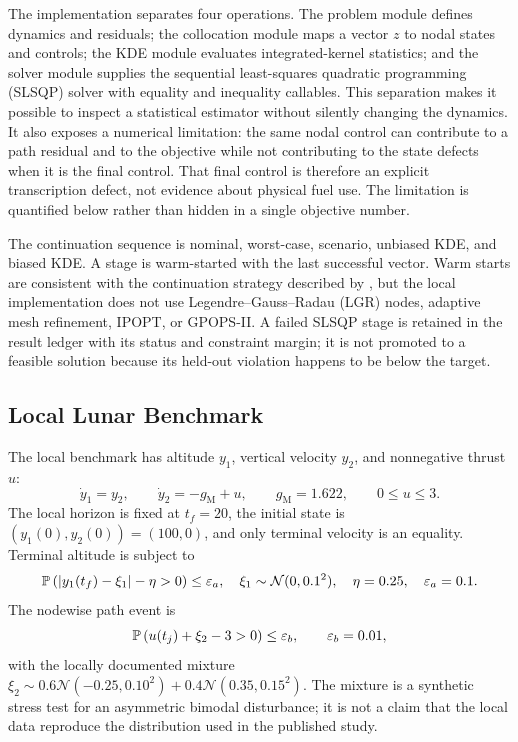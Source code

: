 The implementation separates four operations. The problem module defines dynamics and residuals; the collocation module maps a vector $z$ to nodal states and controls; the KDE module evaluates integrated-kernel statistics; and the solver module supplies the sequential least-squares quadratic programming (SLSQP) solver with equality and inequality callables. This separation makes it possible to inspect a statistical estimator without silently changing the dynamics. It also exposes a numerical limitation: the same nodal control can contribute to a path residual and to the objective while not contributing to the state defects when it is the final control. That final control is therefore an explicit transcription defect, not evidence about physical fuel use. The limitation is quantified below rather than hidden in a single objective number.

The continuation sequence is nominal, worst-case, scenario, unbiased KDE, and biased KDE. A stage is warm-started with the last successful vector. Warm starts are consistent with the continuation strategy described by \citet{keil2021warm}, but the local implementation does not use Legendre--Gauss--Radau (LGR) nodes, adaptive mesh refinement, IPOPT, or GPOPS-II. A failed SLSQP stage is retained in the result ledger with its status and constraint margin; it is not promoted to a feasible solution because its held-out violation happens to be below the target.

\subsection{Local Lunar Benchmark}
\label{sec:lunar-benchmark}

The local benchmark has altitude $y_1$, vertical velocity $y_2$, and nonnegative thrust $u$:
\begin{equation}
 \dot y_1=y_2,\qquad \dot y_2=-g_{\mathrm M}+u,\qquad g_{\mathrm M}=1.622,\qquad 0\leq u\leq3.
 \label{eq:lunar-dynamics}
\end{equation}
The local horizon is fixed at $t_f=20$, the initial state is $(y_1(0),y_2(0))=(100,0)$, and only terminal velocity is an equality. Terminal altitude is subject to
\begin{equation}
 \mathbb{P}\left(\left|y_1(t_f)-\xi_1\right|-\eta>0\right)\leq\varepsilon_a,
 \quad \xi_1\sim\mathcal N(0,0.1^2),\quad \eta=0.25,\quad \varepsilon_a=0.1.
 \label{eq:lunar-terminal-risk}
\end{equation}
The nodewise path event is
\begin{equation}
 \mathbb{P}\left(u(t_j)+\xi_2-3>0\right)\leq\varepsilon_b,
 \qquad \varepsilon_b=0.01,
 \label{eq:lunar-path-risk}
\end{equation}
with the locally documented mixture $\xi_2\sim0.6\mathcal N(-0.25,0.10^2)+0.4\mathcal N(0.35,0.15^2)$. The mixture is a synthetic stress test for an asymmetric bimodal disturbance; it is not a claim that the local data reproduce the distribution used in the published study.

